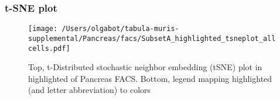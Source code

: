 \clearpage
\subsubsection{t-SNE plot}
\begin{figure}[h]
\centering
\texttt{[image: /Users/olgabot/tabula-muris-supplemental/Pancreas/facs/SubsetA\_highlighted\_tsneplot\_allcells.pdf]}

\caption{Top, t-Distributed stochastic neighbor embedding (tSNE) plot  in highlighted of Pancreas FACS. Bottom, legend mapping highlighted (and letter abbreviation) to colors}
\end{figure}

